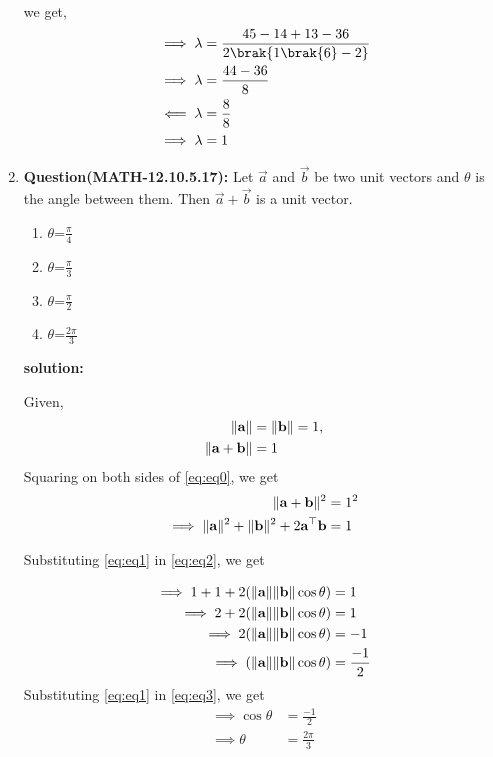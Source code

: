 \begin{enumerate}[label=\thesection.\arabic*,ref=\thesection.\theenumi]
\begin{align*}
\end{align*}
we get,
\begin{align}   
&\implies\lambda=\frac{45-14+13-36}{2\brak{1\brak{6}-2}}\\
&\implies\lambda=\frac{44-36}{8}\\
&\impliedby\lambda=\frac{8}{8}\\
 &\implies \lambda = 1 
\end{align}
 \item \textbf{Question(MATH-12.10.5.17):}
       Let $\vec{a}$ and $\vec{b}$ be two unit vectors and $\theta$ is the angle between them. Then $\vec{a}+\vec{b}$ is a unit vector.
    
 \begin{enumerate}[label=(\Alph*)]                     
 \item $\theta$=$\frac{\pi}{4}$
 \item $\theta$=$\frac{\pi}{3}$
  \item $\theta$=$\frac{\pi}{2}$
   \item $\theta$=$\frac{2\pi}{3}$
   \end{enumerate}
		 \textbf{solution:}

Given,
\begin{align}
	\lVert\textbf{a}\rVert &= \lVert\textbf{b}\rVert=1 
 \label{eq:eq1},\\
	\lVert\textbf{a}+\textbf{b}\rVert&=1
 \label{eq:eq0}
 \end{align}
Squaring on both sides of \eqref{eq:eq0}, we get
\begin{align}
	\lVert\textbf{a}+\textbf{b}\rVert^2 &=1^2
\\	
	\implies \lVert\textbf{a}\rVert^2 + \lVert\textbf{b}\rVert^2 + 2\textbf{a}^{\top}\textbf{b} &= 1
 \label{eq:eq2}
\end{align}

Substituting \eqref{eq:eq1} in \eqref{eq:eq2}, we get

\begin{align}
	\implies 1+1+2(\lVert\textbf{a}\rVert\lVert\textbf{b}\rVert\cos{\theta}) &=1\\
	\implies 2+2(\lVert\textbf{a}\rVert\lVert\textbf{b}\rVert\cos{\theta}) &=1\\
	\implies 2(\lVert\textbf{a}\rVert\lVert\textbf{b}\rVert\cos{\theta}) &=-1\\
	\implies (\lVert\textbf{a}\rVert\lVert\textbf{b}\rVert\cos{\theta}) &=\frac{-1}{2}
 \label{eq:eq3}
\end{align}
Substituting \eqref{eq:eq1} in \eqref{eq:eq3}, we get
\begin{align}
	\implies \cos{\theta} &=\frac{-1}{2}
	\\
	\implies \theta &=\frac{2\pi}{3}
\end{align}


\end{enumerate}
